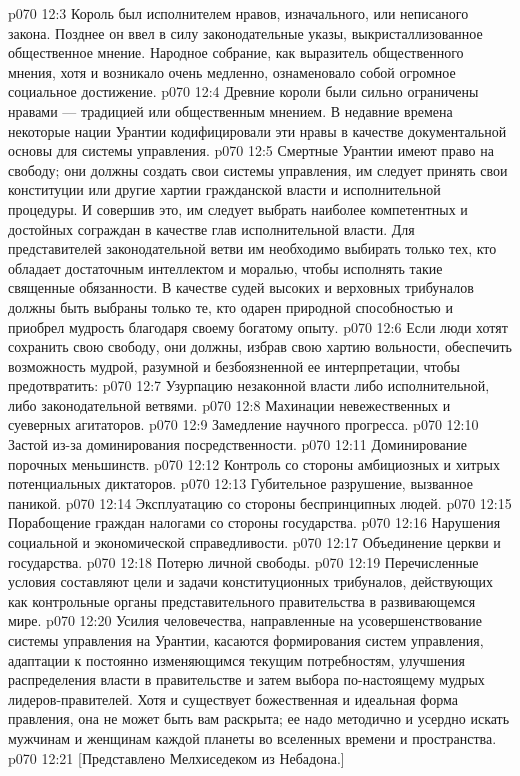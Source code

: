 \vs p070 12:3 Король был исполнителем нравов, изначального, или неписаного закона. Позднее он ввел в силу законодательные указы, выкристаллизованное общественное мнение. Народное собрание, как выразитель общественного мнения, хотя и возникало очень медленно, ознаменовало собой огромное социальное достижение.
\vs p070 12:4 Древние короли были сильно ограничены нравами --- традицией или общественным мнением. В недавние времена некоторые нации Урантии кодифицировали эти нравы в качестве документальной основы для системы управления.
\vs p070 12:5 \pc Смертные Урантии имеют право на свободу; они должны создать свои системы управления, им следует принять свои конституции или другие хартии гражданской власти и исполнительной процедуры. И совершив это, им следует выбрать наиболее компетентных и достойных сограждан в качестве глав исполнительной власти. Для представителей законодательной ветви им необходимо выбирать только тех, кто обладает достаточным интеллектом и моралью, чтобы исполнять такие священные обязанности. В качестве судей высоких и верховных трибуналов должны быть выбраны только те, кто одарен природной способностью и приобрел мудрость благодаря своему богатому опыту.
\vs p070 12:6 Если люди хотят сохранить свою свободу, они должны, избрав свою хартию вольности, обеспечить возможность мудрой, разумной и безбоязненной ее интерпретации, чтобы предотвратить:
\vs p070 12:7 \bibnobreakspace Узурпацию незаконной власти либо исполнительной, либо законодательной ветвями.
\vs p070 12:8 \bibnobreakspace Махинации невежественных и суеверных агитаторов.
\vs p070 12:9 \bibnobreakspace Замедление научного прогресса.
\vs p070 12:10 \bibnobreakspace Застой из\hyp{}за доминирования посредственности.
\vs p070 12:11 \bibnobreakspace Доминирование порочных меньшинств.
\vs p070 12:12 \bibnobreakspace Контроль со стороны амбициозных и хитрых потенциальных диктаторов.
\vs p070 12:13 \bibnobreakspace Губительное разрушение, вызванное паникой.
\vs p070 12:14 \bibnobreakspace Эксплуатацию со стороны беспринципных людей.
\vs p070 12:15 \bibnobreakspace Порабощение граждан налогами со стороны государства.
\vs p070 12:16 \bibnobreakspace Нарушения социальной и экономической справедливости.
\vs p070 12:17 \bibnobreakspace Объединение церкви и государства.
\vs p070 12:18 \bibnobreakspace Потерю личной свободы.
\vs p070 12:19 \pc Перечисленные условия составляют цели и задачи конституционных трибуналов, действующих как контрольные органы представительного правительства в развивающемся мире.
\vs p070 12:20 Усилия человечества, направленные на усовершенствование системы управления на Урантии, касаются формирования систем управления, адаптации к постоянно изменяющимся текущим потребностям, улучшения распределения власти в правительстве и затем выбора по\hyp{}настоящему мудрых лидеров\hyp{}правителей. Хотя и существует божественная и идеальная форма правления, она не может быть вам раскрыта; ее надо методично и усердно искать мужчинам и женщинам каждой планеты во вселенных времени и пространства.
\vsetoff
\vs p070 12:21 [Представлено Мелхиседеком из Небадона.]
